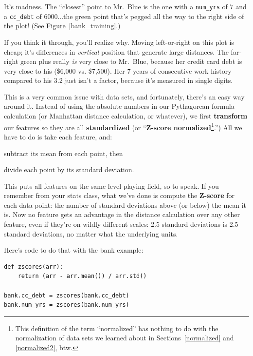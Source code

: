 It's madness. The ``closest'' point to Mr.~Blue is the one with a
\texttt{num\_yrs} of 7 and a \texttt{cc\_debt} of 6000...the green point that's
pegged all the way to the right side of the plot! (See
Figure~\ref{bank_training}.)

If you think it through, you'll realize why. Moving left-or-right on this plot
is cheap; it's differences in \textit{vertical} position that generate large
distances. The far-right green plus really \textit{is} very close to Mr.~Blue,
because her credit card debt is very close to his (\$6,000 vs. \$7,500). Her 7
years of consecutive work history compared to his 3.2 just isn't a factor,
because it's measured in single digits.


This is a very common issue with data sets, and fortunately, there's an easy
way around it. Instead of using the absolute numbers in our Pythagorean formula
calculation (or Manhattan distance calculation, or whatever), we first
\textbf{transform} our features so they are all \textbf{standardized} (or
``\textbf{Z-score normalized}\footnote{This definition of the term
``normalized'' has nothing to do with the normalization of data sets we learned
about in Sections~\ref{normalized} and \ref{normalized2}, btw.}.'') All we have
to do is take each feature, and:

\begin{compactenum}
\item subtract its mean from each point, then
\item divide each point by its standard deviation.
\end{compactenum}

This puts all features on the same level playing field, so to speak. If you
remember from your stats class, what we've done is compute the \textbf{Z-score}
for each data point: the number of standard deviations above (or below) the
mean it is. Now no feature gets an advantage in the distance calculation over
any other feature, even if they're on wildly different scales: 2.5 standard
deviations is 2.5 standard deviations, no matter what the underlying units.

\smallskip
Here's code to do that with the bank example:

\begin{Verbatim}[fontsize=\small,samepage=true,frame=single,framesep=3mm]
def zscores(arr):
    return (arr - arr.mean()) / arr.std()

bank.cc_debt = zscores(bank.cc_debt)
bank.num_yrs = zscores(bank.num_yrs)
\end{Verbatim}

